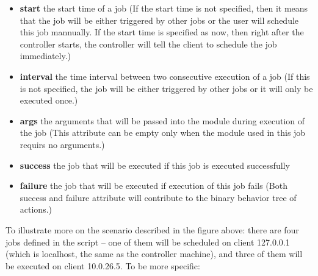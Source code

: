 \documentclass[12pt]{report}
\begin{document}
\begin{itemize}
\item \textbf{start} the start time of a job (If the start time is not specified, then it means that the job will be either triggered by other jobs or the user will schedule this job mannually. If the start time is specified as now, then right after the controller starts, the controller will tell the client to schedule the job immediately.)
\item \textbf{interval} the time interval between two consecutive execution of a job (If this is not specified, the job will be either triggered by other jobs or it will only be executed once.)
\item \textbf{args} the arguments that will be passed into the module during execution of the job (This attribute can be empty only when the module used in this job requirs no arguments.)
\item \textbf{success} the job that will be executed if this job is executed successfully
\item \textbf{failure} the job that will be executed if execution of this job fails (Both success and failure attribute will contribute to the binary behavior tree of actions.)
\end{itemize}

To illustrate more on the scenario described in the figure above: there are four jobs defined in the script -- one of them will be scheduled on client 127.0.0.1 (which is localhost, the same as the controller machine), and three of them will be executed on client 10.0.26.5. To be more specific:
\end{document}

